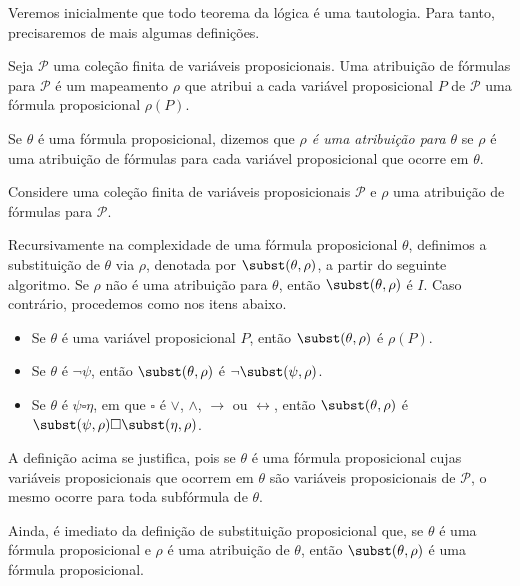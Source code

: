 Veremos inicialmente que todo teorema da lógica é uma tautologia.
Para tanto, precisaremos de mais algumas definições.

\begin{metadefinition}Seja $\mathcal P$ uma coleção finita de variáveis proposicionais.
    Uma atribuição de fórmulas para $\mathcal P$ é um mapeamento $\rho$ que atribui a cada variável proposicional $P$ de $\mathcal P$ uma fórmula proposicional $\rho(P)$.

    Se $\theta$ é uma fórmula proposicional, dizemos que \emph{$\rho$ é uma atribuição para $\theta$} se $\rho$ é uma atribuição de fórmulas para cada variável proposicional que ocorre em $\theta$.
\end{metadefinition}

\begin{metadefinition}\label{mdef:substituicaoProposicional}
   Considere uma coleção finita de variáveis proposicionais $\mathcal P$ e $\rho$ uma atribuição de fórmulas para $\mathcal P$.

   Recursivamente na complexidade de uma fórmula proposicional $\theta$, definimos a substituição de $\theta$ via $\rho$, denotada por $\subst(\theta, \rho)$, a partir do seguinte algoritmo.
   Se $\rho$ não é uma atribuição para $\theta$, então $\subst(\theta, \rho)$ é $I$.
   Caso contrário, procedemos como nos itens abaixo.
    \begin{itemize}
        \item Se $\theta$ é uma variável proposicional $P$, então $\subst(\theta, \rho)$ é $\rho(P)$.
        \item Se $\theta$ é $\neg \psi$, então $\subst(\theta, \rho)$ é $\neg \subst(\psi, \rho)$.
        \item Se $\theta$ é $ \psi \square \eta$, em que $\square$ é $\vee$, $\wedge$, $\rightarrow$ ou $\leftrightarrow$, então $\subst(\theta, \rho)$ é $\subst(\psi, \rho) \square \subst(\eta, \rho)$.
    \end{itemize}
\end{metadefinition}
A definição acima se justifica, pois se $\theta$ é uma fórmula proposicional cujas variáveis proposicionais que ocorrem em $\theta$ são variáveis proposicionais de $\mathcal P$, o mesmo ocorre para toda subfórmula de $\theta$.

Ainda, é imediato da definição de substituição proposicional que, se $\theta$ é uma fórmula proposicional e $\rho$ é uma atribuição de $\theta$, então $\subst(\theta, \rho)$ é uma fórmula proposicional.

